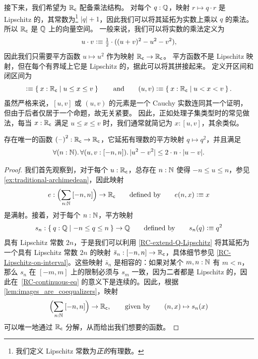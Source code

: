 %
接下来，我们希望为 $\mathbb{R}_\mathsf{c}$ 配备乘法结构。
对每个 $q : \mathbb{Q}$，映射 $r \mapsto q \cdot r$ 是 Lipschitz 的，其常数为\footnote{我们定义 Lipschitz 常数为\emph{正的}有理数。} $|q| + 1$，因此我们可以将其延拓为实数上乘以 $q$ 的乘法。
所以 $\mathbb{R}_\mathsf{c}$ 是 $\mathbb{Q}$ 上的向量空间。
一般来说，我们可以将实数的乘法定义为
%
\begin{equation}
  u \cdot v \vcentcolon\equiv
  {\textstyle \frac{1}{2}} \cdot ((u + v)^2 - u^2 - v^2),\label{mult-from-square}
\end{equation}
%
因此我们只需要平方函数 $u \mapsto u^2$ 作为映射 $\mathbb{R}_\mathsf{c} \to \mathbb{R}_\mathsf{c}$。
平方函数不是 Lipschitz 映射，但在每个有界域上它是 Lipschitz 的，据此可以将其拼接起来。
定义开区间和闭区间为
%
%
%
%
\begin{equation*}
  [u,v] \defeq \setof{ x : \RC | u \leq x \leq v }
  \qquad\text{and}\qquad
  (u,v) \defeq \setof{ x : \RC | u < x < v }.
\end{equation*}
%
虽然严格来说，$[u,v]$ 或 $(u,v)$ 的元素是一个 Cauchy 实数连同其一个证明，但由于后者仅居于一个命题，故无关紧要。
因此，正如处理子集类型时的常见做法，每当 $x:\mathbb{R}_\mathsf{c}$ 满足 $u\leq x \leq v$ 时，我们通常就简记为 $x:[u,v]$，其余类似。

\begin{thm} \label{RC-squaring}
  存在唯一的函数 ${(\mathord{\hspace{1pt}\text{--}\hspace{1pt}})}^2 : \mathbb{R}_\mathsf{c} \to \mathbb{R}_\mathsf{c}$，它延拓有理数的平方映射 $q \mapsto
  q^2$，并且满足
  \begin{equation*}
    \fall{n : \N}
    \fall{u, v : [-n, n]}
    |u^2 - v^2| \leq 2 \cdot n \cdot |u - v|.
  \end{equation*}
\end{thm}

\begin{proof}
  我们首先观察到，对于每个 $u : \mathbb{R}_\mathsf{c}$，总存在 $n : \mathbb{N}$ 使得 $-n \leq u \leq n$，参见 \cref{ex:traditional-archimedean}，因此映射
  \begin{equation*}
    e : \Parens{\sm{n : \N} [-n, n]} \to \RC
    \qquad\text{defined by}\qquad
    e(n, x) \defeq x
  \end{equation*}
  是满射。接着，对于每个 $n : \mathbb{N}$，平方映射
  \begin{equation*}
    s_n : \setof{ q : \Q | -n \leq q \leq n } \to \Q
    \qquad\text{defined by}\qquad
    s_n(q) \defeq q^2
  \end{equation*}
  具有 Lipschitz 常数 $2 n$，于是我们可以利用 \cref{RC-extend-Q-Lipschitz} 将其延拓为一个具有 Lipschitz 常数 $2 n$ 的映射 $\bar{s}_n : [-n, n] \to \mathbb{R}_\mathsf{c}$，具体细节参见 \cref{RC-Lipschitz-on-interval}。这些映射 $\bar{s}_n$ 是相容的：如果对某个 $m, n : \mathbb{N}$ 有 $m < n$，那么 $s_n$ 在 $[-m, m]$ 上的限制必须与 $s_m$ 一致，因为二者都是 Lipschitz 的，因此在~\cref{RC-continuous-eq} 的意义下是连续的。因此，根据 \cref{lem:images_are_coequalizers}，映射
  \begin{equation*}
    \Parens{\sm{n : \N} [-n, n]} \to \RC,
    \qquad\text{given by}\qquad
    (n, x) \mapsto s_n(x)
  \end{equation*}
  可以唯一地通过 $\mathbb{R}_\mathsf{c}$ 分解，从而给出我们想要的函数。
\end{proof}

